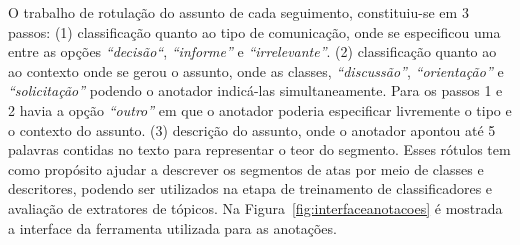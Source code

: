








O trabalho de rotulação do assunto de cada seguimento, constituiu-se em 3 passos:
(1) classificação quanto ao tipo de comunicação, onde se especificou uma entre as opções 
\textit{``decisão``},
\textit{``informe''} e 
\textit{``irrelevante''}. 
(2) classificação quanto ao ao contexto onde se gerou o assunto, onde as classes, 
\textit{``discussão''},
\textit{``orientação''} e	
\textit{``solicitação''} podendo o anotador indicá-las simultaneamente.
Para os passos 1 e 2 havia a opção \textit{``outro''} em que o anotador poderia especificar livremente o tipo e o contexto do assunto.
(3) descrição do assunto, onde o anotador apontou até 5 palavras contidas no texto para representar o teor do segmento.
Esses rótulos tem como propósito ajudar a descrever os segmentos de atas por meio de classes e descritores, podendo ser utilizados na etapa de treinamento de classificadores e avaliação de extratores de tópicos.
Na Figura~\ref{fig:interfaceanotacoes} é mostrada a interface da ferramenta utilizada para as anotações.




